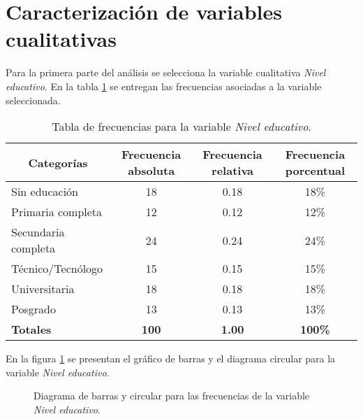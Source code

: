 \section*{Caracterización de variables cualitativas}
Para la primera parte del análisis se selecciona la variable cualitativa \emph{Nivel educativo}. En la tabla \ref{tab:tablaFrecuentasVariableCualitativa} se entregan las frecuencias asociadas a la variable seleccionada.\par
\begin{table}[!htbp]
    \begin{footnotesize}
    \centering
    \begin{tabular}{lccc}
        \toprule
        \multicolumn{1}{c}{\textbf{Categorías}} & \multicolumn{1}{c}{\textbf{Frecuencia absoluta}} & \multicolumn{1}{c}{\textbf{Frecuencia relativa}} & \multicolumn{1}{c}{\textbf{Frecuencia porcentual}}\\
        \midrule
        Sin educación & 18 & 0.18 & 18\% \\
        \midrule
        Primaria completa & 12 & 0.12 & 12\% \\
        \midrule
        Secundaria completa & 24 & 0.24 & 24\% \\
        \midrule
        Técnico/Tecnólogo & 15 & 0.15 & 15\% \\
        \midrule
        Universitaria & 18 & 0.18 & 18\% \\
        \midrule
        Posgrado & 13 & 0.13 & 13\% \\
        \toprule
        \rowcolor{myGray}
        \textbf{Totales} & \textbf{100} & \textbf{1.00} & \textbf{100\%} \\
        \bottomrule
    \end{tabular}
    \caption{\footnotesize{Tabla de frecuencias para la variable \emph{Nivel educativo}.}}
    \label{tab:tablaFrecuentasVariableCualitativa}
    \end{footnotesize}
\end{table}
En la figura \ref{fig:graficasVariableCualitativa} se presentan el gráfico de barras y el diagrama circular para la variable \emph{Nivel educativo}.\par
\vspace{1em}
\begin{figure}[!ht]
    \centering
    \noindent\parbox[][][c]{.55\linewidth}{
        
    }
    \parbox[][][c]{.4\linewidth}{
        
    }\par
    \caption{\footnotesize{Diagrama de barras y circular para las frecuencias de la variable \emph{Nivel educativo}.}}
    \label{fig:graficasVariableCualitativa}
\end{figure}
